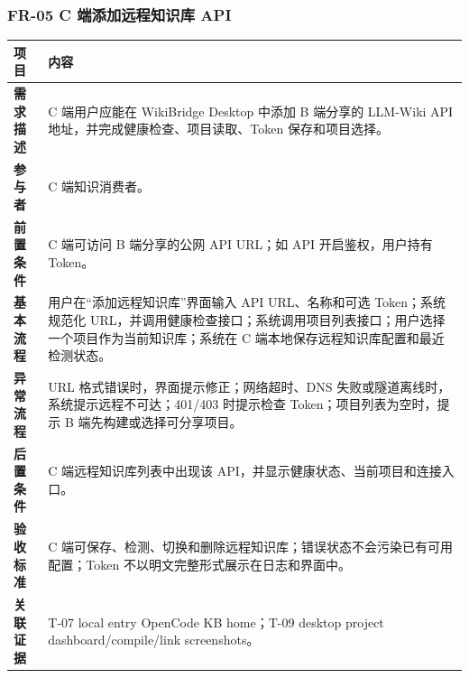 \documentclass[UTF8,a4paper,12pt,fontset=fandol]{ctexart}
\begin{document}
\subsubsection{FR-05 C 端添加远程知识库 API}
\begin{longtable}{>{\bfseries}p{2.4cm}p{11.8cm}}
\toprule
项目 & 内容 \\
\midrule
需求描述 & C 端用户应能在 WikiBridge Desktop 中添加 B 端分享的 LLM-Wiki API 地址，并完成健康检查、项目读取、Token 保存和项目选择。 \\
参与者 & C 端知识消费者。 \\
前置条件 & C 端可访问 B 端分享的公网 API URL；如 API 开启鉴权，用户持有 Token。 \\
基本流程 & 用户在“添加远程知识库”界面输入 API URL、名称和可选 Token；系统规范化 URL，并调用健康检查接口；系统调用项目列表接口；用户选择一个项目作为当前知识库；系统在 C 端本地保存远程知识库配置和最近检测状态。 \\
异常流程 & URL 格式错误时，界面提示修正；网络超时、DNS 失败或隧道离线时，系统提示远程不可达；401/403 时提示检查 Token；项目列表为空时，提示 B 端先构建或选择可分享项目。 \\
后置条件 & C 端远程知识库列表中出现该 API，并显示健康状态、当前项目和连接入口。 \\
验收标准 & C 端可保存、检测、切换和删除远程知识库；错误状态不会污染已有可用配置；Token 不以明文完整形式展示在日志和界面中。 \\
关联证据 & T-07 local entry OpenCode KB home；T-09 desktop project dashboard/compile/link screenshots。 \\
\bottomrule
\end{longtable}
\end{document}

